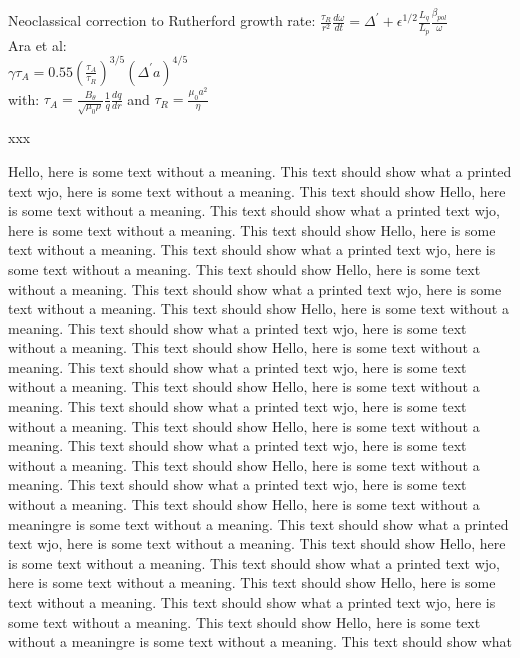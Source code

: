 \documentclass{article}
\begin{document}
\begin{multicols}{3}
Neoclassical correction to Rutherford growth rate:
$\frac{\tau_{R}}{r^{2}} \frac{d\omega}{dt} = \Delta ^{\prime} + \epsilon^{1/2}\frac{L_{q}}{L_{p}}\frac{\beta_{pol}}{\omega}$\\

Ara et al:\\
$\gamma \tau_{A} = 0.55 (\frac{\tau_{A}}{\tau_{R}})^{3/5}(\Delta^{\prime}a)^{4/5}$\\
with: $\tau_{A} = \frac{B_{\theta}}{\sqrt{\mu_{0}\rho}}\frac{1}{q}\frac{dq}{dr}$
 and $\tau_{R} = \frac{\mu_{0}a^{2}}{\eta}$
 

xxx

Hello, here is some text without a meaning.  This text should show what 
a printed text wjo, here is some text without a meaning.  This text should show 
Hello, here is some text without a meaning.  This text should show what 
a printed text wjo, here is some text without a meaning.  This text should show 
Hello, here is some text without a meaning.  This text should show what 
a printed text wjo, here is some text without a meaning.  This text should show 
Hello, here is some text without a meaning.  This text should show what 
a printed text wjo, here is some text without a meaning.  This text should show 
Hello, here is some text without a meaning.  This text should show what 
a printed text wjo, here is some text without a meaning.  This text should show 
Hello, here is some text without a meaning.  This text should show what 
a printed text wjo, here is some text without a meaning.  This text should show 
Hello, here is some text without a meaning.  This text should show what 
a printed text wjo, here is some text without a meaning.  This text should show 
Hello, here is some text without a meaning.  This text should show what 
a printed text wjo, here is some text without a meaning.  This text should show 
Hello, here is some text without a meaning.  This text should show what 
a printed text wjo, here is some text without a meaning.  This text should show 
Hello, here is some text without a meaningre is some text without a meaning.  This text should show what 
a printed text wjo, here is some text without a meaning.  This text should show 
Hello, here is some text without a meaning.  This text should show what 
a printed text wjo, here is some text without a meaning.  This text should show 
Hello, here is some text without a meaning.  This text should show what 
a printed text wjo, here is some text without a meaning.  This text should show 
Hello, here is some text without a meaningre is some text without a meaning.  This text should show what 

\end{multicols}
\end{document}
